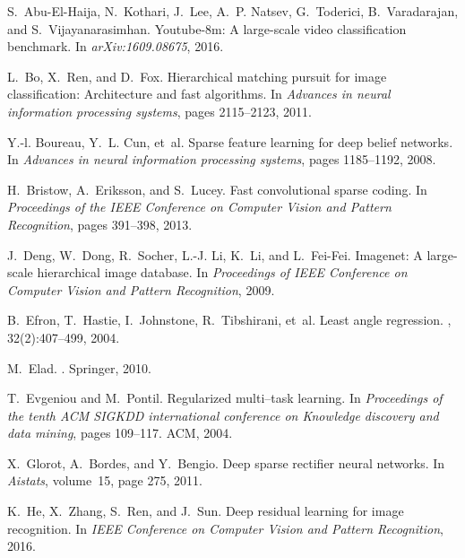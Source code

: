 \documentclass[10pt,twocolumn,letterpaper]{article}
\begin{document}
\begin{thebibliography}{10}\itemsep=-1pt

S.~Abu-El-Haija, N.~Kothari, J.~Lee, A.~P. Natsev, G.~Toderici, B.~Varadarajan,
  and S.~Vijayanarasimhan.
\newblock Youtube-8m: A large-scale video classification benchmark.
\newblock In {\em arXiv:1609.08675}, 2016.

L.~Bo, X.~Ren, and D.~Fox.
\newblock Hierarchical matching pursuit for image classification: Architecture
  and fast algorithms.
\newblock In {\em Advances in neural information processing systems}, pages
  2115--2123, 2011.

Y.-l. Boureau, Y.~L. Cun, et~al.
\newblock Sparse feature learning for deep belief networks.
\newblock In {\em Advances in neural information processing systems}, pages
  1185--1192, 2008.

H.~Bristow, A.~Eriksson, and S.~Lucey.
\newblock Fast convolutional sparse coding.
\newblock In {\em Proceedings of the IEEE Conference on Computer Vision and
  Pattern Recognition}, pages 391--398, 2013.

J.~Deng, W.~Dong, R.~Socher, L.-J. Li, K.~Li, and L.~Fei-Fei.
\newblock Imagenet: A large-scale hierarchical image database.
\newblock In {\em {Proceedings of IEEE Conference on Computer Vision and
  Pattern Recognition}}, 2009.

B.~Efron, T.~Hastie, I.~Johnstone, R.~Tibshirani, et~al.
\newblock Least angle regression.
, 32(2):407--499, 2004.

M.~Elad.
.
\newblock Springer, 2010.

T.~Evgeniou and M.~Pontil.
\newblock Regularized multi--task learning.
\newblock In {\em Proceedings of the tenth ACM SIGKDD international conference
  on Knowledge discovery and data mining}, pages 109--117. ACM, 2004.

X.~Glorot, A.~Bordes, and Y.~Bengio.
\newblock Deep sparse rectifier neural networks.
\newblock In {\em Aistats}, volume~15, page 275, 2011.

K.~He, X.~Zhang, S.~Ren, and J.~Sun.
\newblock Deep residual learning for image recognition.
\newblock In {\em IEEE Conference on Computer Vision and Pattern Recognition},
  2016.


\end{thebibliography}
\end{document}
